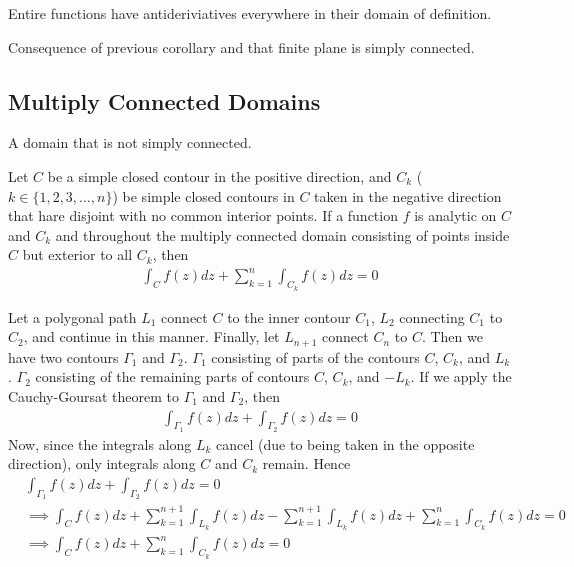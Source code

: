 \documentclass[12pt, english]{book}
\makeatletter
\renewenvironment{proof}[1][\proofname]{\par
	\pushQED{\qed}%
	\normalfont \topsep6\p@\@plus6\p@\relax
	\list{}{%
		\settowidth{\leftmargin}{\itshape\proofname:\hskip\labelsep}%
		\setlength{\labelwidth}{0pt}%
		\setlength{\itemindent}{-\leftmargin}%
	}%
	\item[\hskip\labelsep\itshape#1\@addpunct{:}]\ignorespaces
}{%
	\popQED\endlist\@endpefalse
}
\makeatother
\begin{document}
	\begin{corollary}
		Entire functions have antideriviatives everywhere in their domain of definition.
	\end{corollary}
	\begin{proof}
		Consequence of previous corollary and that finite plane is simply connected.
	\end{proof}

	\subsection{Multiply Connected Domains} \label{Multiply Connected Domains Subsection - Complex}
	
	\begin{definition}
		A domain that is not simply connected.
	\end{definition}

	\begin{theorem}
		\label{Contour integral over Multiply Connected Domains Theorem - Complex}
		Let \(C\) be a simple closed contour in the positive direction, and \(C_k\) (\(k \in \{1,2,3,\ldots, n\}\)) be simple closed contours in \(C\) taken in the negative direction that hare disjoint with no common interior points. If a function \(f\) is analytic on \(C\) and \(C_k\) and throughout the multiply connected domain consisting of points inside \(C\) but exterior to all \(C_k\), then
		\begin{align*}
			\int_{C} f(z) dz + \sum_{k=1}^{n} \int_{C_k} f(z) dz = 0
		\end{align*}
	\end{theorem}
	\begin{proof}
		Let a polygonal path \(L_1\) connect \(C\) to the inner contour \(C_1\), \(L_2\) connecting \(C_1\) to \(C_2\), and continue in this manner. Finally, let \(L_{n+1}\) connect \(C_n\) to \(C\). Then we have two contours \(\Gamma_1\) and \(\Gamma_2\). \(\Gamma_1\) consisting of parts of the contours \(C\), \(C_k\), and \(L_k\). \(\Gamma_2\) consisting of the remaining parts of contours \(C\), \(C_k\), and \(-L_k\). If we apply the Cauchy-Goursat theorem to \(\Gamma_1\) and \(\Gamma_2\), then
		\begin{align*}
			\int_{\Gamma_1} f(z) dz + \int_{\Gamma_2} f(z) dz = 0
		\end{align*}
		Now, since the integrals along \(L_k\) cancel (due to being taken in the opposite direction), only integrals along \(C\) and \(C_k\) remain. Hence
		\begin{align*}
			&\int_{\Gamma_1} f(z) dz + \int_{\Gamma_2} f(z) dz = 0 \\
			&\implies \int_{C} f(z) dz + \sum_{k=1}^{n+1} \int_{L_k} f(z) dz - \sum_{k=1}^{n+1} \int_{L_k} f(z) dz + \sum_{k=1}^{n} \int_{C_k} f(z) dz = 0 \\
			&\implies \int_{C} f(z) dz + \sum_{k=1}^{n} \int_{C_k} f(z) dz = 0
		\end{align*}
	\end{proof}
\end{document}
